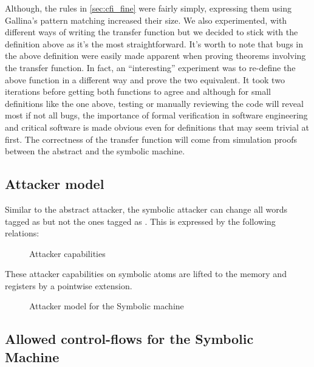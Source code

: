 Although, the rules in \cref{sec:cfi_fine} were fairly simply,
expressing them using Gallina's pattern matching increased their
size. We also experimented, with different ways of writing the
transfer function but we decided to stick with the definition above as
it's the most straightforward. It's worth to note that bugs in the
above definition were easily made apparent when proving theorems
involving the transfer function. In fact, an ``interesting''
experiment was to re-define the above function in a different way and
prove the two equivalent. It took two iterations before getting both
functions to agree and although for small definitions like the one
above, testing or manually reviewing the code will reveal most if not
all bugs, the importance of formal verification in software
engineering and critical software is made obvious even for definitions
that may seem trivial at first. The correctness of the transfer
function will come from simulation proofs between the abstract and the
symbolic machine.

\subsection{Attacker model}\label{sec:symbolic_attacker}

Similar to the abstract attacker, the symbolic attacker can change all words
tagged as \DATAname but not the ones tagged as \INSTRname. This is expressed by
the following relations:

\begin{figure}[htbp]
\bigskip
{}
\caption{Attacker capabilities}
\label{fig:symbolic_attacker_atom}
\end{figure}

These attacker capabilities on symbolic atoms are lifted to
the memory and registers by a pointwise extension.

\begin{figure}[htbp]
\caption{Attacker model for the Symbolic machine}
\label{fig:symbolic_attacker}
\end{figure}

\subsection{Allowed control-flows for the Symbolic Machine}
\label{sec:symbolic_flow}

